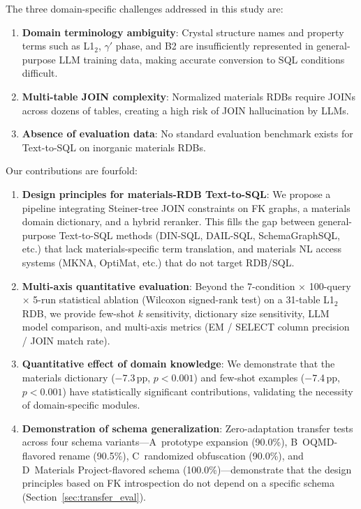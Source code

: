\documentclass{npj-compt.mater}
\begin{document}
The three domain-specific challenges addressed in this study are:
\begin{enumerate}
  \item \textbf{Domain terminology ambiguity}:
    Crystal structure names and property terms such as
    L1$_2$, $\gamma'$ phase, and B2 are insufficiently represented
    in general-purpose LLM training data,
    making accurate conversion to SQL conditions difficult.
  \item \textbf{Multi-table JOIN complexity}:
    Normalized materials RDBs require JOINs across dozens of tables,
    creating a high risk of JOIN hallucination by LLMs.
  \item \textbf{Absence of evaluation data}:
    No standard evaluation benchmark exists for Text-to-SQL
    on inorganic materials RDBs.
\end{enumerate}

Our contributions are fourfold:
\begin{enumerate}[label=(\roman*)]
  \item \textbf{Design principles for materials-RDB Text-to-SQL}:
    We propose a pipeline integrating Steiner-tree JOIN constraints
    on FK graphs, a materials domain dictionary, and a hybrid reranker.
    This fills the gap between general-purpose Text-to-SQL methods
    (DIN-SQL, DAIL-SQL, SchemaGraphSQL, etc.) that lack
    materials-specific term translation,
    and materials NL access systems (MKNA, OptiMat, etc.)
    that do not target RDB/SQL.
  \item \textbf{Multi-axis quantitative evaluation}:
    Beyond the 7-condition $\times$ 100-query $\times$ 5-run
    statistical ablation (Wilcoxon signed-rank test)
    on a 31-table L1$_2$ RDB,
    we provide few-shot $k$ sensitivity, dictionary size sensitivity,
    LLM model comparison, and multi-axis metrics
    (EM / SELECT column precision / JOIN match rate).
  \item \textbf{Quantitative effect of domain knowledge}:
    We demonstrate that the materials dictionary ($-$7.3\,pp, $p<0.001$)
    and few-shot examples ($-$7.4\,pp, $p<0.001$)
    have statistically significant contributions,
    validating the necessity of domain-specific modules.
  \item \textbf{Demonstration of schema generalization}:
    Zero-adaptation transfer tests across four schema variants---A~prototype expansion (90.0\%), B~OQMD-flavored rename (90.5\%), C~randomized obfuscation (90.0\%), and D~Materials Project-flavored schema (100.0\%)---demonstrate that the design principles based on FK introspection do not depend on a specific schema (Section~\ref{sec:transfer_eval}).
\end{enumerate}
\end{document}
